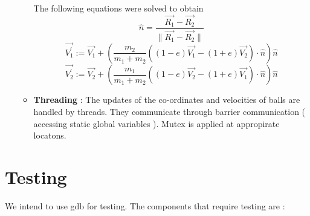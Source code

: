 \documentclass[]{article}
\begin{document}
\begin{itemize}
\begin{flushleft}
\begin{itemize}
The following equations were solved to obtain 
\begin{equation}
\hat{n} = \frac{\vec{R_{1}} - \vec{R_{2}}}{ \parallel \vec{R_{1}} - \vec{R_{2}} \parallel}
\end{equation}
\begin{equation}
\vec{V_{1}^{'}} := \vec{V_{1}} + (\frac{m_{2}}{m_{1} + m_{2}}((1-e)\vec{V_{1}} - (1+e)\vec{V_{2}})\cdotp\hat{n})\hat{n}
\end{equation}
\begin{equation}
\vec{V_{2}^{'}} := \vec{V_{2}} + (\frac{m_{1}}{m_{1} + m_{2}}((1-e)\vec{V_{2}} - (1+e)\vec{V_{1}})\cdotp\hat{n})\hat{n}
\end{equation}


\item \textbf{Threading} : The updates of the co-ordinates and velocities of balls are handled by threads. They communicate through barrier communication ( accessing static global variables ). Mutex is applied at appropirate locatons.

\end{itemize}

 

\end{flushleft}

\end{itemize}

\section{Testing}

We intend to use gdb for testing. The components that require testing are :
\end{document}
